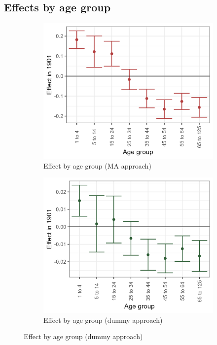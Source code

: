 \FloatBarrier
\subsection{Effects by age group} 
\begin{figure}[h!]
    \centering
    \caption{Age group composition}
    \begin{subfigure}[b]{0.45\textwidth}
        \centering
        \caption{\label{fig:migr} Effect by age group (MA approach)}
        \includegraphics[width=\textwidth]{Plots/Mechanism/Age_composition_MA.png}
    \end{subfigure}
    \hfill
    \begin{subfigure}[b]{0.45\textwidth}
        \centering
        \caption{\label{fig:fert} Effect by age group (dummy approach)}
        \includegraphics[width=\textwidth]{Plots/Mechanism/Age_composition_Dummy.png}

\end{subfigure}
\end{figure}

